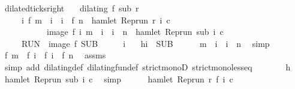 \begin{isabellebody}
{\isafoldproof}%
%
\isadelimproof
\isanewline
%
\endisadelimproof
\isanewline
{}\isamarkupfalse%
\ dilated{\isacharunderscore}ticks{\isacharunderscore}right{\isacharcolon}\isanewline
\ \ \ {\isacartoucheopen}dilating\ f\ sub\ r{\isacartoucheclose}\isanewline
\ \ \ \ \ {\isacartoucheopen}{\isacharbraceleft}i{\isachardot}\ f\ m\ {\isacharless}\ i\ {\isasymand}\ i\ {\isasymle}\ f\ n\ {\isasymand}\ hamlet\ {\isacharparenleft}{\isacharparenleft}Rep{\isacharunderscore}run\ r{\isacharparenright}\ i\ c{\isacharparenright}{\isacharbraceright}\isanewline
\ \ \ \ \ \ \ \ \ \ {\isacharequal}\ image\ f\ {\isacharbraceleft}i{\isachardot}\ m\ {\isacharless}\ i\ {\isasymand}\ i\ {\isasymle}\ n\ {\isasymand}\ hamlet\ {\isacharparenleft}{\isacharparenleft}Rep{\isacharunderscore}run\ sub{\isacharparenright}\ i\ c{\isacharparenright}{\isacharbraceright}{\isacartoucheclose}\isanewline
\ \ \ \ {\isacharparenleft}\ {\isacartoucheopen}{\isacharquery}RUN\ {\isacharequal}\ image\ f\ {\isacharquery}SUB{\isacartoucheclose}{\isacharparenright}\isanewline
%
\isadelimproof
%
\endisadelimproof
%
\isatagproof
{}\isamarkupfalse%
\isanewline
\ \ \isacommand{{\isacharbraceleft}}\isamarkupfalse%
\ \isamarkupfalse%
\ i\ \ \isamarkupfalse%
\ h{\isacharcolon}{\isacartoucheopen}i\ {\isasymin}\ {\isacharquery}SUB{\isacartoucheclose}\isanewline
\ \ \ \ \isamarkupfalse%
\ {\isacartoucheopen}m\ {\isacharless}\ i\ {\isasymand}\ i\ {\isasymle}\ n{\isacartoucheclose}\ \isamarkupfalse%
\ simp\isanewline
\ \ \ \ \isamarkupfalse%
\ {\isacartoucheopen}f\ m\ {\isacharless}\ f\ i\ {\isasymand}\ f\ i\ {\isasymle}\ {\isacharparenleft}f\ n{\isacharparenright}{\isacartoucheclose}\ \isamarkupfalse%
\ assms\isanewline
\ \ \ \ \ \ \isamarkupfalse%
\ {\isacharparenleft}simp\ add{\isacharcolon}\ dilating{\isacharunderscore}def\ dilating{\isacharunderscore}fun{\isacharunderscore}def\ strict{\isacharunderscore}monoD\ strict{\isacharunderscore}mono{\isacharunderscore}less{\isacharunderscore}eq{\isacharparenright}\isanewline
\ \ \ \ \isamarkupfalse%
\ \isamarkupfalse%
\ h\ \isamarkupfalse%
\ {\isacartoucheopen}hamlet\ {\isacharparenleft}{\isacharparenleft}Rep{\isacharunderscore}run\ sub{\isacharparenright}\ i\ c{\isacharparenright}{\isacartoucheclose}\ \isamarkupfalse%
\ simp\isanewline
\ \ \ \ \isamarkupfalse%
\ {\isacartoucheopen}hamlet\ {\isacharparenleft}{\isacharparenleft}Rep{\isacharunderscore}run\ r{\isacharparenright}\ {\isacharparenleft}f\ i{\isacharparenright}\ c{\isacharparenright}{\isacartoucheclose}\ \isamarkupfalse%

\end{isabellebody}
